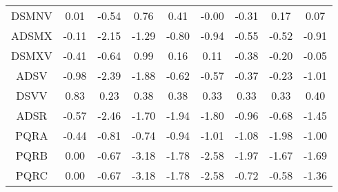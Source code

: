 \documentclass[11pt,a4paper]{report}
\begin{document}
\begin{longtable}{ | c || c | c | c | c | c | c | c || c |}
DSMNV &  \cellcolor[HTML]{FFFFFF} 0.01 &  \cellcolor[HTML]{FFEFEF} -0.54 &  \cellcolor[HTML]{EFEFFF} 0.76 &  \cellcolor[HTML]{F7F7FF} 0.41 &  \cellcolor[HTML]{FFFFFF} -0.00 &  \cellcolor[HTML]{FFF7F7} -0.31 &  \cellcolor[HTML]{F7F7FF} 0.17 &  \cellcolor[HTML]{FFFFFF} 0.07 \\
ADSMX &  \cellcolor[HTML]{FFFFFF} -0.11 &  \cellcolor[HTML]{FFC7C7} -2.15 &  \cellcolor[HTML]{FFDFDF} -1.29 &  \cellcolor[HTML]{FFE7E7} -0.80 &  \cellcolor[HTML]{FFE7E7} -0.94 &  \cellcolor[HTML]{FFEFEF} -0.55 &  \cellcolor[HTML]{FFEFEF} -0.52 &  \cellcolor[HTML]{FFE7E7} -0.91 \\
DSMXV &  \cellcolor[HTML]{FFF7F7} -0.41 &  \cellcolor[HTML]{FFEFEF} -0.64 &  \cellcolor[HTML]{E7E7FF} 0.99 &  \cellcolor[HTML]{F7F7FF} 0.16 &  \cellcolor[HTML]{FFFFFF} 0.11 &  \cellcolor[HTML]{FFF7F7} -0.38 &  \cellcolor[HTML]{FFF7F7} -0.20 &  \cellcolor[HTML]{FFFFFF} -0.05 \\
ADSV &  \cellcolor[HTML]{FFE7E7} -0.98 &  \cellcolor[HTML]{FFBFBF} -2.39 &  \cellcolor[HTML]{FFCFCF} -1.88 &  \cellcolor[HTML]{FFEFEF} -0.62 &  \cellcolor[HTML]{FFEFEF} -0.57 &  \cellcolor[HTML]{FFF7F7} -0.37 &  \cellcolor[HTML]{FFF7F7} -0.23 &  \cellcolor[HTML]{FFE7E7} -1.01 \\
DSVV &  \cellcolor[HTML]{E7E7FF} 0.83 &  \cellcolor[HTML]{F7F7FF} 0.23 &  \cellcolor[HTML]{F7F7FF} 0.38 &  \cellcolor[HTML]{F7F7FF} 0.38 &  \cellcolor[HTML]{F7F7FF} 0.33 &  \cellcolor[HTML]{F7F7FF} 0.33 &  \cellcolor[HTML]{F7F7FF} 0.33 &  \cellcolor[HTML]{F7F7FF} 0.40 \\
ADSR &  \cellcolor[HTML]{FFEFEF} -0.57 &  \cellcolor[HTML]{FFBFBF} -2.46 &  \cellcolor[HTML]{FFD7D7} -1.70 &  \cellcolor[HTML]{FFCFCF} -1.94 &  \cellcolor[HTML]{FFCFCF} -1.80 &  \cellcolor[HTML]{FFE7E7} -0.96 &  \cellcolor[HTML]{FFEFEF} -0.68 &  \cellcolor[HTML]{FFD7D7} -1.45 \\
PQRA &  \cellcolor[HTML]{FFF7F7} -0.44 &  \cellcolor[HTML]{FFE7E7} -0.81 &  \cellcolor[HTML]{FFEFEF} -0.74 &  \cellcolor[HTML]{FFE7E7} -0.94 &  \cellcolor[HTML]{FFE7E7} -1.01 &  \cellcolor[HTML]{FFE7E7} -1.08 &  \cellcolor[HTML]{FFCFCF} -1.98 &  \cellcolor[HTML]{FFE7E7} -1.00 \\
PQRB &  \cellcolor[HTML]{FFFFFF} 0.00 &  \cellcolor[HTML]{FFEFEF} -0.67 &  \cellcolor[HTML]{FFAFAF} -3.18 &  \cellcolor[HTML]{FFCFCF} -1.78 &  \cellcolor[HTML]{FFBFBF} -2.58 &  \cellcolor[HTML]{FFCFCF} -1.97 &  \cellcolor[HTML]{FFD7D7} -1.67 &  \cellcolor[HTML]{FFD7D7} -1.69 \\
PQRC &  \cellcolor[HTML]{FFFFFF} 0.00 &  \cellcolor[HTML]{FFEFEF} -0.67 &  \cellcolor[HTML]{FFAFAF} -3.18 &  \cellcolor[HTML]{FFCFCF} -1.78 &  \cellcolor[HTML]{FFBFBF} -2.58 &  \cellcolor[HTML]{FFEFEF} -0.72 &  \cellcolor[HTML]{FFEFEF} -0.58 &  \cellcolor[HTML]{FFDFDF} -1.36 \\

\end{longtable}
\end{document}
